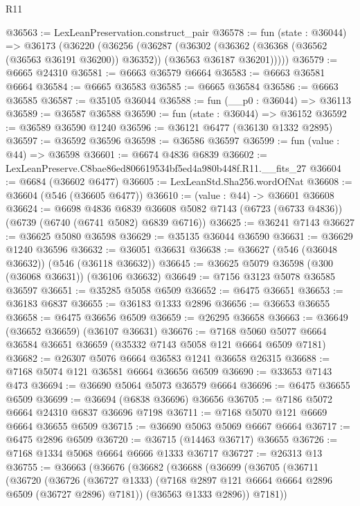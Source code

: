 \begin{lexlean}{R11}
\begin{coremodule}
@36563 := LexLeanPreservation.construct_pair
@36578 := fun (state : @36044) =>
  @36173
    (@36220
      (@36256
        (@36287
          (@36302
            (@36362 (@36368 (@36562 (@36563 @36191 @36200)) @36352))
            (@36563 @36187 @36201)))))
@36579 := @6665 @24310
@36581 := @6663 @36579 @6664
@36583 := @6663 @36581 @6664
@36584 := @6665 @36583
@36585 := @6665 @36584
@36586 := @6663 @36585
@36587 := @35105 @36044
@36588 := fun (__p0 : @36044) => @36113
@36589 := @36587 @36588
@36590 := fun (state : @36044) => @36152
@36592 := @36589 @36590 @1240
@36596 := @36121 @6477 (@36130 @1332 @2895)
@36597 := @36592 @36596
@36598 := @36586 @36597
@36599 := fun (value : @44) => @36598
@36601 := @6674 @4836 @6839
@36602 := LexLeanPreserve.C8bae86ed806619534bf5ed4a980b448f.R11.__fits_27
@36604 := @6684 (@36602 @6477)
@36605 := LexLeanStd.Sha256.wordOfNat
@36608 := @36604 (@546 (@36605 @6477))
@36610 := (value : @44) -> @36601 @36608
@36624 := @6698
    @4836
    @6839
    @36608
    @5082
    @7143
    (@6723 (@6733 @4836))
    (@6739 (@6740 (@6741 @5082) @6839 @6716))
@36625 := @36241 @7143
@36627 := @36625 @5080 @36598
@36629 := @35135 @36044 @36590
@36631 := @36629 @1240 @36596
@36632 := @36051 @36631
@36638 := @36627 (@546 (@36048 @36632)) (@546 (@36118 @36632))
@36645 := @36625 @5079 @36598 (@300 (@36068 @36631)) (@36106 @36632)
@36649 := @7156 @3123 @5078 @36585 @36597
@36651 := @35285 @5058 @6509
@36652 := @6475 @36651
@36653 := @36183 @6837
@36655 := @36183 @1333 @2896
@36656 := @36653 @36655
@36658 := @6475 @36656 @6509
@36659 := @26295 @36658
@36663 := @36649 (@36652 @36659) (@36107 @36631)
@36676 := @7168 @5060 @5077 @6664 @36584 @36651 @36659 (@35332 @7143 @5058 @121 @6664 @6509 @7181)
@36682 := @26307 @5076 @6664 @36583 @1241 @36658 @26315
@36688 := @7168 @5074 @121 @36581 @6664 @36656 @6509
@36690 := @33653 @7143 @473
@36694 := @36690 @5064 @5073 @36579 @6664
@36696 := @6475 @36655 @6509
@36699 := @36694 (@6838 @36696) @36656
@36705 := @7186 @5072 @6664 @24310 @6837 @36696 @7198
@36711 := @7168 @5070 @121 @6669 @6664 @36655 @6509
@36715 := @36690 @5063 @5069 @6667 @6664
@36717 := @6475 @2896 @6509
@36720 := @36715 (@14463 @36717) @36655
@36726 := @7168 @1334 @5068 @6664 @6666 @1333 @36717
@36727 := @26313 @13
@36755 := @36663
    (@36676
      (@36682
        (@36688
          (@36699
            (@36705
              (@36711
                (@36720
                  (@36726
                    (@36727 @1333)
                    (@7168 @2897 @121 @6664 @6664 @2896 @6509 (@36727 @2896) @7181))
                  (@36563 @1333 @2896))
                @7181))

\end{coremodule}
\end{lexlean}
